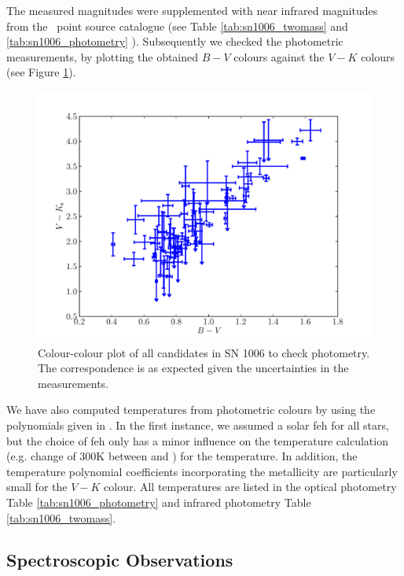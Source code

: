 The measured magnitudes were supplemented with near infrared magnitudes from the \twomass\ point source catalogue (see Table \ref{tab:sn1006_twomass} and \ref{tab:sn1006_photometry} ). Subsequently we checked the photometric measurements, by plotting the obtained $B-V$ colours against the $V-K$ colours (see Figure \ref{fig:colour_check}).
\begin{figure}[htbp] %
   \centering
   \includegraphics[width=\textwidth]{chapter_sn1006/plots/color_bv_vk.pdf} 
   \caption[Colour-colour plot of all candidates in SN 1006 to check photometry]{Colour-colour plot of all candidates in SN 1006 to check photometry. The correspondence is as expected given the uncertainties in the measurements.}
   \label{fig:colour_check}
\end{figure}

We have also computed temperatures from photometric colours by using the polynomials given in \citet{2010A&A...512A..54C}. In the first instance, we assumed a solar \gls{feh} for all stars, but the choice of \gls{feh} only has a minor influence on the temperature calculation (e.g. change of 300K between  and ) for the temperature. In addition, the temperature polynomial coefficients incorporating the metallicity are particularly small for the $V-K$ colour. All temperatures are listed in the optical photometry Table \ref{tab:sn1006_photometry} and infrared photometry Table \ref{tab:sn1006_twomass}.


\subsection{Spectroscopic Observations}

